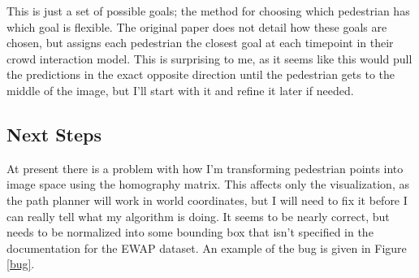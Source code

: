 \documentclass[a4paper,11pt,headings=small]{article}
\begin{document}
This is just a set of possible goals; the method for choosing which pedestrian has which goal is flexible. The original paper does not detail how these goals are chosen, but \cite{Pellegrini2009} assigns each pedestrian the closest goal at each timepoint in their crowd interaction model. This is surprising to me, as it seems like this would pull the predictions in the exact opposite direction until the pedestrian gets to the middle of the image, but I'll start with it and refine it later if needed.

\subsection*{Next Steps}
\quad At present there is a problem with how I'm transforming pedestrian points into image space using the homography matrix. This affects only the visualization, as the path planner will work in world coordinates, but I will need to fix it before I can really tell what my algorithm is doing. It seems to be nearly correct, but needs to be normalized into some bounding box that isn't specified in the documentation for the EWAP dataset. An example of the bug is given in Figure \ref{bug}.
\end{document}
